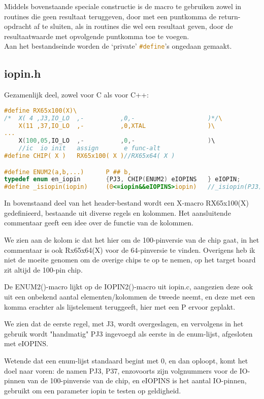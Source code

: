 \documentclass[a4paper, 11pt, fleqn, twoside]{scrartcl}%
\begin{document}
Middels bovenstaande speciale constructie is de macro te gebruiken zowel in 
routines die geen resultaat teruggeven, door met een puntkomma de 
return-opdracht af te sluiten, als in routines die wel een resultaat geven, 
door de resultaatwaarde met opvolgende puntkomma toe te voegen.\\

Aan het bestandseinde worden de `private' \lstinline[language=C]!#define!'s 
ongedaan gemaakt.

\subsection{iopin.h}
Gezamenlijk deel, zowel voor C als voor C++:

\begin{lstlisting}[language=C,backgroundcolor=\color{orange!10},framerule=0pt,columns=fixed]
#define RX65x100(X)\
/*	X( 4 ,J3,IO_LO	,-			,0,-					)*/\
	X(11 ,37,IO_LO	,-			,0,XTAL					)\
...
	X(100,05,IO_LO	,-			,0,-					)\
	//ic  io init	assign		 e func-alt
#define CHIP( X )	RX65x100( X )//RX65x64( X )

#define ENUM2(a,b,...)		P ## b,
typedef enum en_iopin		{PJ3, CHIP(ENUM2) eIOPINS	} eIOPIN;
#define _isiopin(iopin)		(0<=iopin&&eIOPINS>iopin)	//_isiopin(PJ3) => 1
\end{lstlisting}

In bovenstaand deel van het header-bestand wordt een X-macro RX65x100(X) 
gedefinieerd, bestaande uit diverse regels en kolommen.
Het aansluitende commentaar geeft een idee over de functie van de kolommen.

We zien aan de kolom ic dat het hier om de 100-pinversie van de chip gaat, 
in het commentaar is ook Rx65x64(X) voor de 64-pinversie te vinden.
Overigens heb ik niet de moeite genomen om de overige chips
te op te nemen, op het target board zit altijd de 100-pin chip.

De ENUM2()-macro lijkt op de IOPIN2()-macro uit iopin.c, aangezien deze ook
uit een onbekend aantal elementen/kolommen de tweede neemt, en deze met een 
komma erachter als lijstelement teruggeeft, hier met een P ervoor geplakt.

We zien dat de eerste regel, met J3, wordt overgeslagen, en vervolgens in het
gebruik wordt "handmatig" PJ3 ingevoegd als eerste in de enum-lijst, afgesloten
met eIOPINS.

Wetende dat een enum-lijst standaard begint met 0, en dan oploopt, komt het doel
naar voren: de namen PJ3, P37, enzovoorts zijn volgnummers voor de IO-pinnen van
de 100-pinversie van de chip, en eIOPINS is het aantal IO-pinnen, gebruikt om
een parameter iopin te testen op geldigheid.
\end{document}
